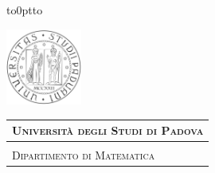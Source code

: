 \documentclass[a4paper, 12pt, twoside, openright]{book}
\begin{document}
\frontmatter
{}

	\hypersetup{linkcolor = black}

\begin{titlepage} %
\begin{center}
\vbox to0pt{\vbox to\vss}

\hspace{0.5cm}
\begin{minipage}{.20\textwidth}
  \includegraphics[height=2.5cm]{images/unipd-bn.png}
\end{minipage}\begin{minipage}{.90\textwidth}
  \begin{table}[H]
  \begin{tabular}{l}
  \scshape{\Large{\bfseries{Università degli Studi di Padova}}} \\
  \hline \\
  \scshape{\Large{Dipartimento di Matematica}} \\
  \end{tabular}
  \end{table}
\end{minipage}


\end{center}
\end{titlepage}
\end{document}
